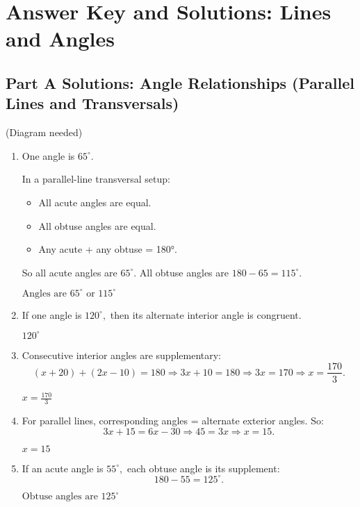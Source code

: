 \documentclass[12pt]{article}
\begin{document}
\newpage


\section*{Answer Key and Solutions: Lines and Angles}

\subsection*{Part A Solutions: Angle Relationships (Parallel Lines and Transversals)}
(Diagram needed)

\begin{enumerate}
  \item One angle is \(65^\circ.\)

  In a parallel-line transversal setup:
  \begin{itemize}
    \item All acute angles are equal.
    \item All obtuse angles are equal.
    \item Any acute + any obtuse = 180°.
  \end{itemize}

  So all acute angles are \(65^\circ.\)  
  All obtuse angles are \(180 - 65 = 115^\circ.\)

  \(\boxed{\text{Angles are }65^\circ \text{ or }115^\circ}\)

  \item If one angle is \(120^\circ,\) then its alternate interior angle is congruent.

  \(\boxed{120^\circ}\)

  \item Consecutive interior angles are supplementary:
  \[
  (x + 20) + (2x - 10) = 180
  \Rightarrow 3x + 10 = 180
  \Rightarrow 3x = 170
  \Rightarrow x = \frac{170}{3}.
  \]

  \(\boxed{x = \tfrac{170}{3}}\)

  \item For parallel lines, corresponding angles = alternate exterior angles.  
  So:
  \[
  3x + 15 = 6x - 30
  \Rightarrow 45 = 3x
  \Rightarrow x = 15.
  \]

  \(\boxed{x = 15}\)

  \item If an acute angle is \(55^\circ,\) each obtuse angle is its supplement:
  \[
  180 - 55 = 125^\circ.
  \]

  \(\boxed{\text{Obtuse angles are }125^\circ}\)
\end{enumerate}
\end{document}

